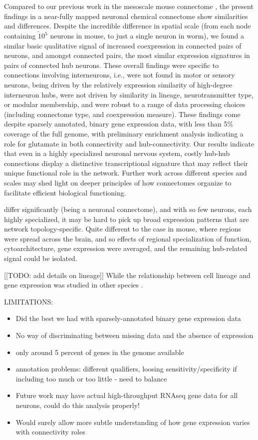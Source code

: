 \documentclass[10pt,letterpaper]{article}
\begin{document}
Compared to our previous work in the mesoscale mouse connectome \cite{Fulcher:2016ck}, the present findings in a near-fully mapped neuronal chemical connectome show similarities and differences.
Despite the incredible difference in spatial scale (from each node containing $\tilde 10^5$ neurons in mouse, to just a single neuron in worm), we found a similar basic qualitative signal of increased coexpression in connected pairs of neurons, and amongst connected pairs, the most similar expression signatures in pairs of connected hub neurons.
These overall findings were specific to connections involving interneurons, i.e., were not found in motor or sensory neurons, being driven by the relatively expression similarity of high-degree interneuron hubs, were not driven by similarity in lineage, neurotransmitter type, or modular membership, and were robust to a range of data processing choices (including connectome type, and coexpression measure).
These findings come despite sparsely annotated, binary gene expression data, with less than 5\% coverage of the full genome, with preliminary enrichment analysis indicating a role for glutamate in both connectivity and hub-connectivity.
Our results indicate that even in a highly specialized neuronal nervous system, costly hub-hub connections display a distinctive transcriptional signature that may reflect their unique functional role in the network.
Further work across different species and scales may shed light on deeper principles of how connectomes organize to facilitate efficient biological functioning.


differ significantly (being a neuronal connectome), and with so few neurons, each highly specialized, it may be hard to pick up broad expression patterns that are network topology-specific.
Quite different to the case in mouse, where regions were spread across the brain, and so effects of regional specialization of function, cytoarchitecture, gene expression were averaged, and the remaining hub-related signal could be isolated.


[[TODO: add details on lineage]] While the relationship between cell lineage and gene expression was studied in other species \cite{Cui2007, Kluger2004}.

LIMITATIONS:
\begin{itemize}
    \item Did the best we had with sparsely-annotated binary gene expression data
    \item No way of discriminating between missing data and the absence of expression
    \item only around 5 percent of genes in the genome available
    \item annotation problems: different qualifiers, loosing sensitivity/specificity if including too much or too little - need to balance
    \item Future work may have actual high-throughput RNAseq gene data for all neurons, could do this analysis properly!
    \item Would surely allow more subtle understanding of how gene expression varies with connectivity roles
\end{itemize}
\end{document}
